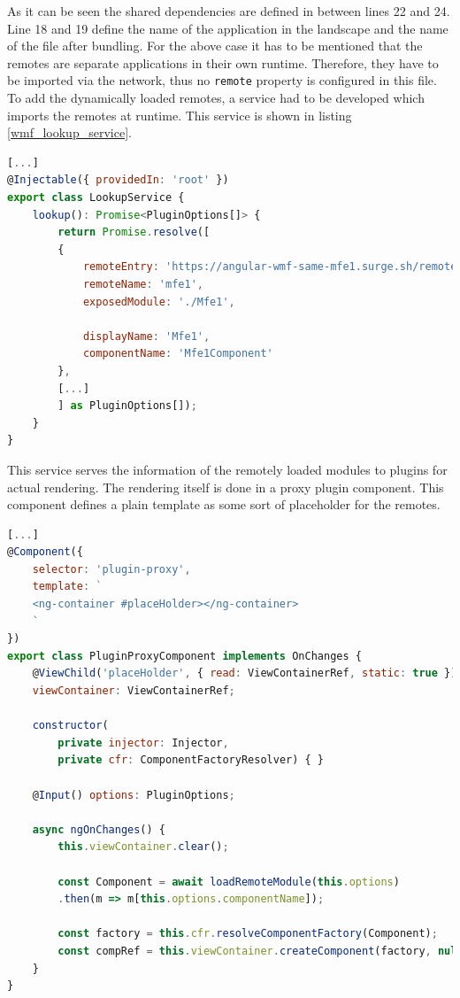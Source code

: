 As it can be seen the shared dependencies are defined in between lines 22 and 24. Line 18 and 19 define the name of the application in the landscape and the name of the file after bundling. For the above case it has to be mentioned that the remotes are separate applications in their own runtime. Therefore, they have to be imported via the network, thus no \texttt{remote} property is configured in this file. To add the dynamically loaded remotes, a service had to be developed which imports the remotes at runtime. This service is shown in listing \ref{wmf_lookup_service}.\cite{wmf_angular_dynamicfederation}

\begin{lstlisting}[language=JavaScript, caption=Content of \texttt{lookup.service.ts} for remote module loading in shell applications, label=wmf_lookup_service]
[...]
@Injectable({ providedIn: 'root' })
export class LookupService {
	lookup(): Promise<PluginOptions[]> {
		return Promise.resolve([
		{
			remoteEntry: 'https://angular-wmf-same-mfe1.surge.sh/remoteEntry.js',
			remoteName: 'mfe1',
			exposedModule: './Mfe1',
			
			displayName: 'Mfe1',
			componentName: 'Mfe1Component'
		},
		[...]	
		] as PluginOptions[]);
	}
}
\end{lstlisting}

This service serves the information of the remotely loaded modules to plugins for actual rendering. The rendering itself is done in a proxy plugin component. This component defines a plain template as some sort of placeholder for the remotes. \cite{wmf_angular_dynamicfederation}
\newpage
\begin{lstlisting}[language=JavaScript, caption=Content of \texttt{plugin-proxy.component.ts} for remote module loading in shell applications, label=wmf_pluginproxy]
[...]	
@Component({
	selector: 'plugin-proxy',
	template: `
	<ng-container #placeHolder></ng-container>
	`
})
export class PluginProxyComponent implements OnChanges {
	@ViewChild('placeHolder', { read: ViewContainerRef, static: true })
	viewContainer: ViewContainerRef;
	
	constructor(
		private injector: Injector,
		private cfr: ComponentFactoryResolver) { }
	
	@Input() options: PluginOptions;
	
	async ngOnChanges() {
		this.viewContainer.clear();
		
		const Component = await loadRemoteModule(this.options)
		.then(m => m[this.options.componentName]);
		
		const factory = this.cfr.resolveComponentFactory(Component);
		const compRef = this.viewContainer.createComponent(factory, null, this.injector);		
	}
}
\end{lstlisting}

